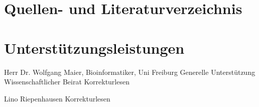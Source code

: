 \documentclass[11pt]{article}
\begin{document}


    \section{Quellen- und Literaturverzeichnis}\label{sec:quellen--und-literaturverzeichnis}



    \section{Unterstützungsleistungen}\label{sec:unterstuetzungsleistungen}

    Herr Dr. Wolfgang Maier, Bioinformatiker, Uni Freiburg
    Generelle Unterstützung
    Wissenschaftlicher Beirat
    Korrekturlesen

    Lino Riepenhausen
    Korrekturlesen
\end{document}
